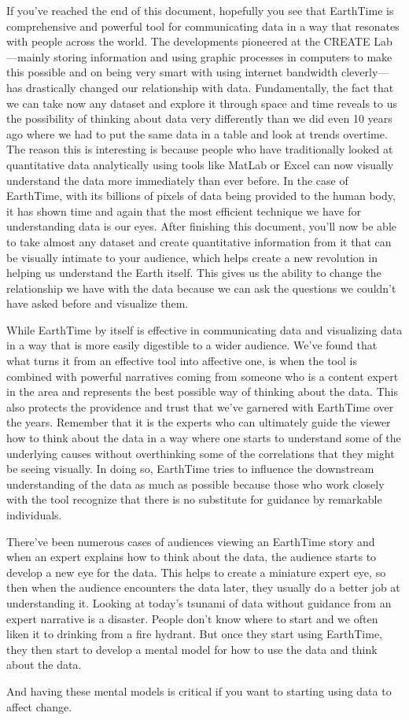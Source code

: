 \documentclass[
]{krantz}
\begin{document}
If you've reached the end of this document, hopefully you see that EarthTime is comprehensive and powerful tool for communicating data in a way that resonates with people across the world. The developments pioneered at the CREATE Lab---mainly storing information and using graphic processes in computers to make this possible and on being very smart with using internet bandwidth cleverly---has drastically changed our relationship with data. Fundamentally, the fact that we can take now any dataset and explore it through space and time reveals to us the possibility of thinking about data very differently than we did even 10 years ago where we had to put the same data in a table and look at trends overtime. The reason this is interesting is because people who have traditionally looked at quantitative data analytically using tools like MatLab or Excel can now visually understand the data more immediately than ever before. In the case of EarthTime, with its billions of pixels of data being provided to the human body, it has shown time and again that the most efficient technique we have for understanding data is our eyes. After finishing this document, you'll now be able to take almost any dataset and create quantitative information from it that can be visually intimate to your audience, which helps create a new revolution in helping us understand the Earth itself. This gives us the ability to change the relationship we have with the data because we can ask the questions we couldn't have asked before and visualize them.

While EarthTime by itself is effective in communicating data and visualizing data in a way that is more easily digestible to a wider audience. We've found that what turns it from an effective tool into affective one, is when the tool is combined with powerful narratives coming from someone who is a content expert in the area and represents the best possible way of thinking about the data. This also protects the providence and trust that we've garnered with EarthTime over the years. Remember that it is the experts who can ultimately guide the viewer how to think about the data in a way where one starts to understand some of the underlying causes without overthinking some of the correlations that they might be seeing visually. In doing so, EarthTime tries to influence the downstream understanding of the data as much as possible because those who work closely with the tool recognize that there is no substitute for guidance by remarkable individuals.

There've been numerous cases of audiences viewing an EarthTime story and when an expert explains how to think about the data, the audience starts to develop a new eye for the data. This helps to create a miniature expert eye, so then when the audience encounters the data later, they usually do a better job at understanding it. Looking at today's tsunami of data without guidance from an expert narrative is a disaster. People don't know where to start and we often liken it to drinking from a fire hydrant. But once they start using EarthTime, they then start to develop a mental model for how to use the data and think about the data.

And having these mental models is critical if you want to starting using data to affect change.

  

\backmatter
\printindex
\end{document}
